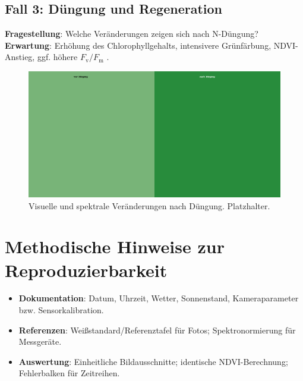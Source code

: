 \subsection{Fall 3: Düngung und Regeneration}
\textbf{Fragestellung}: Welche Veränderungen zeigen sich nach N-Düngung?  
\textbf{Erwartung}: Erhöhung des Chlorophyllgehalts, intensivere Grünfärbung, NDVI-Anstieg, ggf. höhere $F_\mathrm{v}/F_\mathrm{m}$ \parencite{schmidt2015chlorophyll}.
\begin{figure}[H]
  \centering
  \includegraphics[width=.8\textwidth]{bilder/duengung_foto.png}
  \caption{Visuelle und spektrale Veränderungen nach Düngung. Platzhalter.}
  \label{fig:duengung}
\end{figure}

\section{Methodische Hinweise zur Reproduzierbarkeit}
\begin{itemize}
  \item \textbf{Dokumentation}: Datum, Uhrzeit, Wetter, Sonnenstand, Kameraparameter bzw. Sensorkalibration.
  \item \textbf{Referenzen}: Weißstandard/Referenztafel für Fotos; Spektronormierung für Messgeräte.
  \item \textbf{Auswertung}: Einheitliche Bildausschnitte; identische NDVI-Berechnung; Fehlerbalken für Zeitreihen.
\end{itemize}
